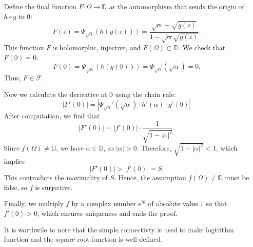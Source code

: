 \documentclass{article}
\begin{document}
Define the final function $F: \Omega \to \mathbb{D}$ as the automorphism that sends the origin of $h \circ g$ to $0$:
$$F(z) = \Psi_{\sqrt{\alpha}}(h(g(z))) = \frac{\sqrt{\alpha} - \sqrt{g(z)}}{1 - \overline{\sqrt{\alpha}} \sqrt{g(z)}}.$$
This function $F$ is holomorphic, injective, and $F(\Omega) \subset \mathbb{D}$. We check that $F(0)=0$:
$$F(0) = \Psi_{\sqrt{\alpha}}(h(g(0))) = \Psi_{\sqrt{\alpha}}(\sqrt{\alpha}) = 0.$$
Thus, $F \in \mathcal{F}$.

Now we calculate the derivative at $0$ using the chain rule:
$$|F'(0)| = \left| \Psi_{\sqrt{\alpha}}'(\sqrt{\alpha}) \cdot h'(\alpha) \cdot g'(0) \right|$$
After computation, we find that
$$|F'(0)| = |f'(0)| \cdot \frac{1}{\sqrt{1 - |\alpha|^2}}.$$
Since $f(\Omega) \ne \mathbb{D}$, we have $\alpha \in \mathbb{D}$, so $|\alpha| > 0$. Therefore, $\sqrt{1 - |\alpha|^2} < 1$, which implies
$$|F'(0)| > |f'(0)| = S.$$
This contradicts the maximality of $S$. Hence, the assumption $f(\Omega) \ne \mathbb{D}$ must be false, so $f$ is surjective.

Finally, we multiply $f$ by a complex number $e^{i\theta}$ of absolute value $1$ so that $f'(0) > 0$, which ensures uniqueness and ends the proof.

\begin{remark}
    It is worthwile to note that the simple connectivty is used to make logtrithm function and the square root function is well-defined.
\end{remark}
\end{document}

